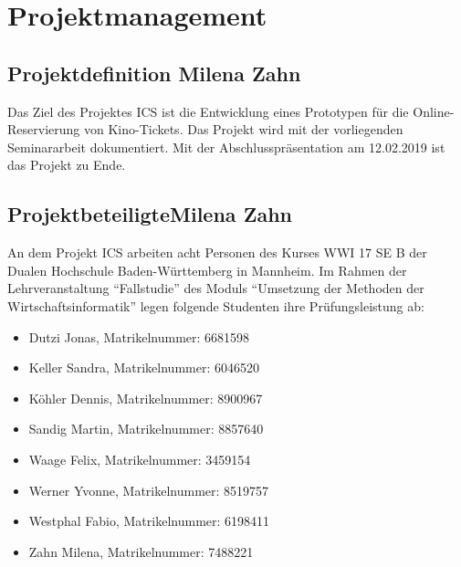 \chapter{Projektmanagement}
	
	\section[Projektdefinition]{Projektdefinition {\hfill \normalsize Milena Zahn}}
	Das Ziel des Projektes \ac{ICS} ist die Entwicklung eines Prototypen für die Online-Reservierung von Kino-Tickets. Das Projekt wird mit der vorliegenden Seminararbeit dokumentiert. Mit der Abschlusspräsentation am 12.02.2019 ist das Projekt zu Ende.
	
	\section[Projektbeteiligte]{Projektbeteiligte{\hfill \normalsize Milena Zahn}}
	An dem Projekt \ac{ICS} arbeiten acht Personen des Kurses WWI 17 SE B der Dualen Hochschule Baden-Württemberg in Mannheim. Im Rahmen der Lehrveranstaltung \enquote{Fallstudie} des Moduls \enquote{Umsetzung der Methoden der Wirtschaftsinformatik} legen folgende Studenten ihre Prüfungsleistung ab:
	\begin{singlespacing}
	\begin{itemize}
		\item Dutzi Jonas, Matrikelnummer: 6681598
		\item Keller Sandra, Matrikelnummer: 6046520 
		\item Köhler Dennis, Matrikelnummer: 8900967 
		\item Sandig Martin, Matrikelnummer: 8857640 
		\item Waage Felix, Matrikelnummer: 3459154 
		\item Werner Yvonne, Matrikelnummer: 8519757 
		\item Westphal Fabio, Matrikelnummer: 6198411  
		\item Zahn Milena, Matrikelnummer: 7488221 
	\end{itemize}
	\end{singlespacing}

